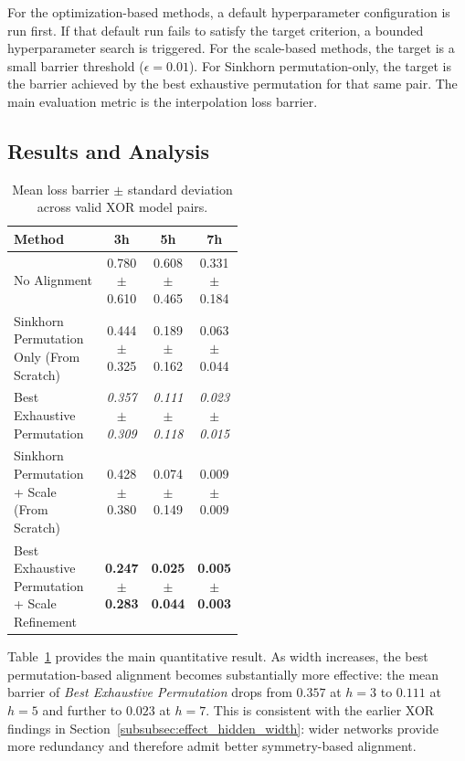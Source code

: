 \documentclass[11pt,a4paper]{report}
\begin{document}
For the optimization-based methods, a default hyperparameter configuration is run first. If that default run fails to satisfy the target criterion, a bounded hyperparameter search is triggered. For the scale-based methods, the target is a small barrier threshold (\(\epsilon = 0.01\)). For Sinkhorn permutation-only, the target is the barrier achieved by the best exhaustive permutation for that same pair. The main evaluation metric is the interpolation loss barrier.

\subsection{Results and Analysis}

\begin{table}[H]
\centering
\small
\begin{tabular}{p{0.50\linewidth}ccc}
\toprule
\textbf{Method} & \textbf{3h} & \textbf{5h} & \textbf{7h} \\
\midrule
No Alignment & 0.780 $\pm$ 0.610 & 0.608 $\pm$ 0.465 & 0.331 $\pm$ 0.184 \\
Sinkhorn Permutation Only (From Scratch) & 0.444 $\pm$ 0.325 & 0.189 $\pm$ 0.162 & 0.063 $\pm$ 0.044 \\
Best Exhaustive Permutation & \textit{0.357} $\pm$ \textit{0.309} & \textit{0.111} $\pm$ \textit{0.118} & \textit{0.023} $\pm$ \textit{0.015} \\
Sinkhorn Permutation + Scale (From Scratch) & 0.428 $\pm$ 0.380 & 0.074 $\pm$ 0.149 & 0.009 $\pm$ 0.009 \\
Best Exhaustive Permutation + Scale Refinement & \textbf{0.247 $\pm$ 0.283} & \textbf{0.025 $\pm$ 0.044} & \textbf{0.005 $\pm$ 0.003} \\
\bottomrule
\end{tabular}
\caption{Mean loss barrier $\pm$ standard deviation across valid XOR model pairs.}
\label{tab:xor_loss_barrier}
\end{table}

Table~\ref{tab:xor_loss_barrier} provides the main quantitative result. As width increases, the best permutation-based alignment becomes substantially more effective: the mean barrier of \emph{Best Exhaustive Permutation} drops from \(0.357\) at \(h=3\) to \(0.111\) at \(h=5\) and further to \(0.023\) at \(h=7\). This is consistent with the earlier XOR findings in Section~\ref{subsubsec:effect_hidden_width}: wider networks provide more redundancy and therefore admit better symmetry-based alignment.
\end{document}
